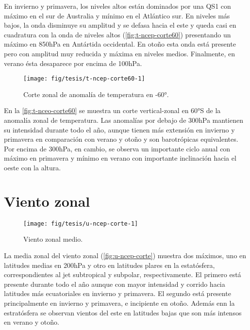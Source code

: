 \documentclass[spanish,a4paper,12p]{book}
\begin{document}
En invierno y primavera, los niveles altos están dominados por una QS1
con máximo en el sur de Australia y mínimo en el Atlántico sur. En
niveles más bajos, la onda disminuye su amplitud y se defasa hacia el
este y queda casi en cuadratura con la onda de niveles altos
(\autoref{fig:t-ncep-corte60}) presentando un máximo en 850hPa en
Antártida occidental. En otoño esta onda está presente pero con amplitud
muy reducida y máxima en niveles medios. Finalmente, en verano ésta
desaparece por encima de 100hPa.

\begin{figure}

{\centering \texttt{[image: fig/tesis/t-ncep-corte60-1]} 

}

\caption{Corte zonal de anomalía de temperatura en -60°.}\label{fig:t-ncep-corte60}
\end{figure}

En la \autoref{fig:t-nceo-corte60} se muestra un corte vertical-zonal en
60°S de la anomalía zonal de temperatura. Las anomalías por debajo de
300hPa mantienen su intensidad durante todo el año, aunque tienen más
extensión en invierno y primavera en comparación con verano y otoño y
son barotrópicas equivalentes. Por encima de 300hPa, en cambio, se
observa un importante ciclo anual con máximo en primavera y mínimo en
verano con importante inclinación hacia el oeste con la altura.

\section{Viento zonal}\label{viento-zonal}

\begin{figure}

{\centering \texttt{[image: fig/tesis/u-ncep-corte-1]} 

}

\caption{Viento zonal medio.}\label{fig:u-ncep-corte}
\end{figure}

La media zonal del viento zonal (\autoref{fig:u-ncep-corte}) muestra dos
máximos, uno en latitudes medias en 200hPa y otro en latitudes plares en
la estatósfera, correspondientes al jet subtropical y subpolar,
respectivamente. El primero está presente durante todo el año aunque con
mayor intensidad y corrido hacia latitudes más ecuatoriales en invierno
y primavera. El segundo está presente principalmente en invierno y
primavera, e incipiente en otoño. Además enn la estratósfera se observan
vientos del este en latitudes bajas que son más intensos en verano y
otoño.
\end{document}
